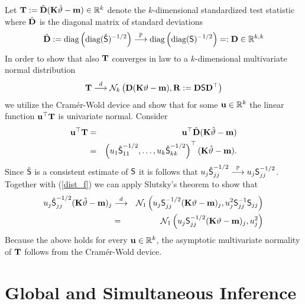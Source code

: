 \documentclass[12pt]{article}
\begin{document}
Let $\T := \hat{\D} (\K \hat{\vartheta} - \m) \in \R^k$ denote
the $k$-dimensional standardized test statistic where $\hat{\D}$ is the diagonal
matrix of standard deviations
\begin{eqnarray*}
\hat{\D} := \text{diag}\left(\text{diag}(\hat{\S})^{-1/2}\right) \cP 
\text{diag}\left(\text{diag}(\S)^{-1/2}\right) =: \D \in \R^{k,k}
\end{eqnarray*}
In order to show that also $\T$ converges in law to a $k$-dimensional multivariate
normal distribution
\begin{eqnarray*}
\T \cL \N_k\left(\D(\K \vartheta - \m), \Cor := \D \S \D^\top\right)
\end{eqnarray*}
we utilize the Cram{\'e}r-Wold device \citep[e.g., Theorem 5.1.8
in][]{Lehmann1999} and show that for some $\uu \in \R^k$ 
the linear function $\uu^\top \T$ is univariate normal. Consider
\begin{eqnarray*}
\uu^\top \T & = & \uu^\top \hat{\D} (\K \hat{\vartheta} - \m) \\
& = & \left(u_1 \hat{\S}_{11}^{-1/2}, \dots, u_k \hat{\S}_{kk}^{-1/2}\right)^\top(\K \hat{\vartheta} - \m).
\end{eqnarray*}
Since $\hat{\S}$ is a consistent estimate of $\S$ it 
is follows that $u_j \hat{\S}_{jj}^{-1/2} \cP u_j \S_{jj}^{-1/2}$.
Together with (\ref{dist_f}) we can apply Slutsky's theorem \citep[Theorem 2.3.3
in][]{Lehmann1999} to show that
\begin{eqnarray*}
u_j \hat{\S}_{jj}^{-1/2} (\K \hat{\vartheta} - \m)_j & \cL &  
\N_1\left(u_j \S_{jj}^{-1/2} (\K \vartheta - \m)_j, u_j^2 \S_{jj}^{-1} \S_{jj}\right) \\
& = & \N_1\left(u_j \S_{jj}^{-1/2} (\K \vartheta - \m)_j, u_j^2\right)
\end{eqnarray*}
Because the above holds for every $\uu \in \R^k$, the asymptotic multivariate
normality of $\T$ follows from the Cram{\'e}r-Wold device. 

\section{Global and Simultaneous Inference} \label{siminf}
\end{document}
